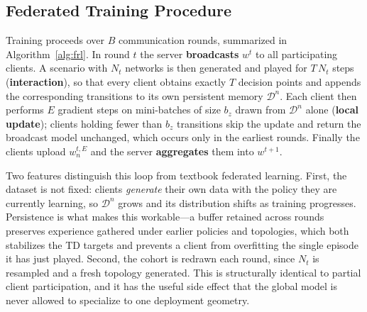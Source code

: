 \documentclass[journal]{IEEEtran}
\begin{document}
\subsection{Federated Training Procedure}
\label{subsec:method_loop}

Training proceeds over $B$ communication rounds, summarized in
Algorithm~\ref{alg:frl}. In round $t$ the server \textbf{broadcasts} $w^{t}$ to
all participating clients. A scenario with $N_{t}$ networks is then generated
and played for $T\,N_{t}$ steps (\textbf{interaction}), so that every client
obtains exactly $T$ decision points and appends the corresponding transitions
to its own persistent memory $\mathcal{D}^{n}$. Each client then performs $E$
gradient steps on mini-batches of size $b_{z}$ drawn from $\mathcal{D}^{n}$
alone (\textbf{local update}); clients holding fewer than $b_{z}$ transitions
skip the update and return the broadcast model unchanged, which occurs only in
the earliest rounds. Finally the clients upload $w^{t,E}_{n}$ and the server
\textbf{aggregates} them into $w^{t+1}$.

Two features distinguish this loop from textbook federated learning. First, the
dataset is not fixed: clients \emph{generate} their own data with the policy
they are currently learning, so $\mathcal{D}^{n}$ grows and its distribution
shifts as training progresses. Persistence is what makes this workable---a
buffer retained across rounds preserves experience gathered under earlier
policies and topologies, which both stabilizes the TD targets and prevents a
client from overfitting the single episode it has just played. Second, the
cohort is redrawn each round, since $N_{t}$ is resampled and a fresh topology
generated. This is structurally identical to partial client participation, and
it has the useful side effect that the global model is never allowed to
specialize to one deployment geometry.
\end{document}
